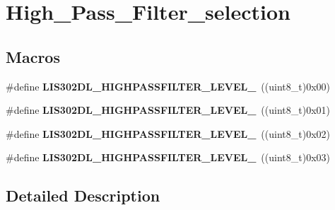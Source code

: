 \hypertarget{group___high___pass___filter__selection}{\section{High\-\_\-\-Pass\-\_\-\-Filter\-\_\-selection}
\label{group___high___pass___filter__selection}
}
\subsection*{Macros}
\begin{DoxyCompactItemize}
\item 
\hypertarget{group___high___pass___filter__selection_ga6153d6145edebfcbfb5caf95a6479e84}{\#define {\bfseries L\-I\-S302\-D\-L\-\_\-\-H\-I\-G\-H\-P\-A\-S\-S\-F\-I\-L\-T\-E\-R\-\_\-\-L\-E\-V\-E\-L\-\_}~((uint8\-\_\-t)0x00)}\label{group___high___pass___filter__selection_ga6153d6145edebfcbfb5caf95a6479e84}

\item 
\hypertarget{group___high___pass___filter__selection_ga60f8973b9c04c00a6c1356eea15a096d}{\#define {\bfseries L\-I\-S302\-D\-L\-\_\-\-H\-I\-G\-H\-P\-A\-S\-S\-F\-I\-L\-T\-E\-R\-\_\-\-L\-E\-V\-E\-L\-\_}~((uint8\-\_\-t)0x01)}\label{group___high___pass___filter__selection_ga60f8973b9c04c00a6c1356eea15a096d}

\item 
\hypertarget{group___high___pass___filter__selection_ga1df7773b2a6a8945ba920383f0ccc252}{\#define {\bfseries L\-I\-S302\-D\-L\-\_\-\-H\-I\-G\-H\-P\-A\-S\-S\-F\-I\-L\-T\-E\-R\-\_\-\-L\-E\-V\-E\-L\-\_}~((uint8\-\_\-t)0x02)}\label{group___high___pass___filter__selection_ga1df7773b2a6a8945ba920383f0ccc252}

\item 
\hypertarget{group___high___pass___filter__selection_gacc32940532bf1027a0632907fea043e0}{\#define {\bfseries L\-I\-S302\-D\-L\-\_\-\-H\-I\-G\-H\-P\-A\-S\-S\-F\-I\-L\-T\-E\-R\-\_\-\-L\-E\-V\-E\-L\-\_}~((uint8\-\_\-t)0x03)}\label{group___high___pass___filter__selection_gacc32940532bf1027a0632907fea043e0}

\end{DoxyCompactItemize}


\subsection{Detailed Description}

